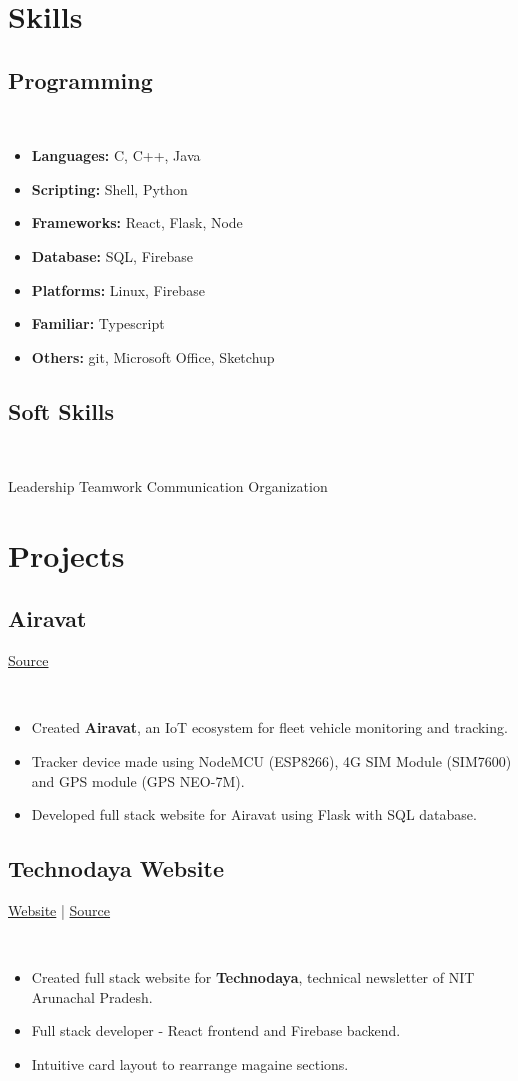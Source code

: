 \documentclass[]{article}
\newcommand{\subheading}[2]{
  {\subsection{#1}
  \hfill \normalsize#2} \\
  \vspace{2pt}
}
\newenvironment{tightemize}{
\vspace{-\topsep}\begin{itemize}\itemsep1pt \parskip0pt \parsep0pt}
{\end{itemize}\vspace{-\topsep}}
\begin{document}
\begin{multicols}{2}
\begin{flushleft}
    
    \section{Skills}
    \subheading{Programming}{}
    \begin{tightemize}
      \item \textbf{Languages:} C, C++, Java
      \item \textbf{Scripting:} Shell, Python
      \item \textbf{Frameworks:} React, Flask, Node
      \item \textbf{Database:} SQL, Firebase
      \item \textbf{Platforms:} Linux, Firebase
      \item \textbf{Familiar:} Typescript
      \item \textbf{Others:} git, Microsoft Office, Sketchup
    \end{tightemize}

    \subheading{Soft Skills}{}
    Leadership \textbullet{} Teamwork \textbullet{} Communication \textbullet{} Organization


    
    \section{Projects}
    \subheading{Airavat}{\href{https://github.com/tripathics/airavat}{Source}}
    \begin{tightemize}
      \item Created \textbf{Airavat}, an IoT ecosystem for fleet vehicle monitoring and tracking.
      \item Tracker device made using NodeMCU (ESP8266), 4G SIM Module (SIM7600) and GPS module (GPS NEO-7M).
      \item Developed full stack website for Airavat using Flask with SQL database.
    \end{tightemize}

    \subheading{Technodaya Website}{
      \href{https://technodaya.netlify.app}{Website} | 
      \href{https://github.com/PursottamSah6003}{Source}
    }
    \begin{tightemize}
      \item Created full stack website for \textbf{Technodaya}, technical newsletter of NIT Arunachal Pradesh.
      \item Full stack developer - React frontend and Firebase backend.
      \item Intuitive card layout to rearrange magaine sections. 
    \end{tightemize}


\end{flushleft}
\end{multicols}
\end{document}
